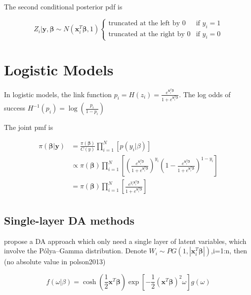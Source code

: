 \documentclass[12pt]{article}
\begin{document}
The second conditional posterior pdf is

\[Z_i|\boldsymbol{y,\beta}\sim N(\mathbf{x}_i^T\boldsymbol{\beta},1)\begin{cases}\text{truncated at the left by 0} & \text{if } y_i=1 \\
 \text{truncated at the right by 0} & \text{if } y_i=0 \end{cases}\]

\hypertarget{logistic-models}{%
\section{Logistic Models}\label{logistic-models}}

In logistic models, the link function
\(p_{i}=H(z_i)= \frac{e^{\mathbf{x}_i^T\boldsymbol{\beta}}}{1+e^{\mathbf{x}_i^T\boldsymbol{\beta}}}\).
The log odds of success \(H^{-1}(p_i)=\log(\frac{p_i}{1-p_i})\)

The joint pmf is

\[\begin{aligned}
\pi(\boldsymbol{\beta|y}) &= \frac{\pi(\boldsymbol{\beta})}{C(y)}\prod_{i=1}^{N}[p(y_i|\beta)]\\
&\propto\pi(\boldsymbol{\beta})\prod_{i=1}^{N}\left[(\frac{e^{\mathbf{x}_i^T\boldsymbol{\beta}}}{1+e^{\mathbf{x}_i^T\boldsymbol{\beta}}})^{y_i}(1-\frac{e^{\mathbf{x}_i^T\boldsymbol{\beta}}}{1+e^{\mathbf{x}_i^T\boldsymbol{\beta}}})^{1-y_i}\right]\\
&=\pi(\boldsymbol{\beta})\prod_{i=1}^{N}\left[\frac{e^{y_i\mathbf{x}_i^T\boldsymbol{\beta}}}{1+e^{\mathbf{x}_i^T\boldsymbol{\beta}}}\right]\\
\end{aligned}\]

\hypertarget{single-layer-da-methods}{%
\subsection{Single-layer DA methods}\label{single-layer-da-methods}}

\citet{polsonBayesianInferenceLogistic2013} propose a DA approach which
only need a single layer of latent variables, which involve the
Pólya--Gamma distribution. Denote
\(W_i \sim PG(1,|\mathbf{x}^T_{i}\boldsymbol{\beta}|)\),i=1:n, then (no
absolute value in polson2013)

\[f(\omega|\beta)=\cosh{(\frac12\mathbf{x}^T\boldsymbol{\beta})}\exp\left[-\frac12(\mathbf{x}^T\boldsymbol{\beta})^2\omega\right]g(\omega)\]
\end{document}

